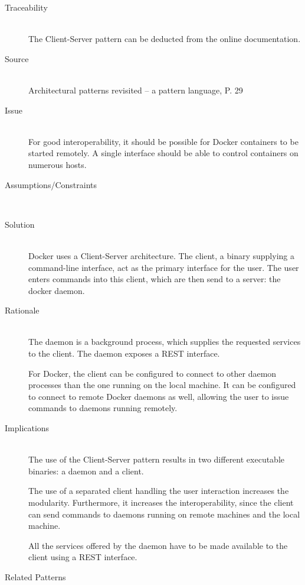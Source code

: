 \begin{description}
\item [Traceability]~\\
The Client-Server pattern can be deducted from the online documentation\cite{dockerarchi}.

\item [Source]~\\
Architectural patterns revisited -- a pattern language, P. 29 \cite{avgeriou2005architectural}

\item [Issue]~\\
For good interoperability, it should be possible for Docker containers to be started remotely. A single interface should be able to control containers on numerous hosts.

\item [Assumptions/Constraints]~

\item [Solution]~\\
Docker uses a Client-Server architecture. The client, a binary supplying a command-line interface, act as the primary interface for the user. The user enters commands into this client, which are then send to a server: the docker daemon. 

\item [Rationale] ~\\
The daemon is a background process, which supplies the requested services to the client. The daemon exposes a REST interface.

For Docker, the client can be configured to connect to other daemon processes than the one running on the local machine. It can be configured to connect to remote Docker daemons as well, allowing the user to issue commands to daemons running remotely.

\item [Implications]~\\
The use of the Client-Server pattern results in two different executable binaries: a daemon and a client. 

The use of a separated client handling the user interaction increases the modularity.
Furthermore, it increases the interoperability, since the client can send commands to daemons running on remote machines and the local machine.

All the services offered by the daemon have to be made available to the client using a REST interface.


\item [Related Patterns]~\\


\end{description}

